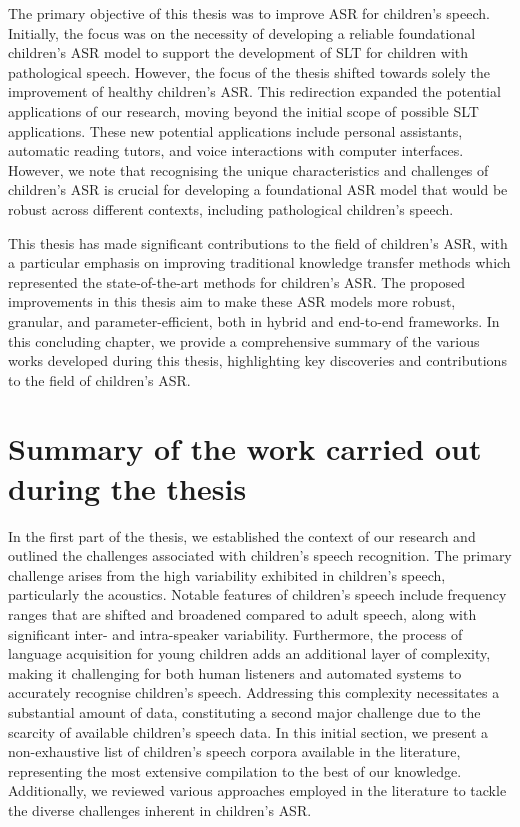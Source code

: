 \label{chap:8}
\cleardoublepage

The primary objective of this thesis was to improve \ac{ASR} for children's speech. Initially, the focus was on the necessity of developing a reliable foundational children's \ac{ASR} model to support the development of \ac{SLT} for children with pathological speech. However, the focus of the thesis shifted towards solely the improvement of healthy children's \ac{ASR}. This redirection expanded the potential applications of our research, moving beyond the initial scope of possible \ac{SLT} applications. These new potential applications include personal assistants, automatic reading tutors, and voice interactions with computer interfaces. However, we note that recognising the unique characteristics and challenges of children's \ac{ASR} is crucial for developing a foundational \ac{ASR} model that would be robust across different contexts, including pathological children's speech.

This thesis has made significant contributions to the field of children's \ac{ASR}, with a particular emphasis on improving traditional knowledge transfer methods which represented the state-of-the-art methods for children's \ac{ASR}. The proposed improvements in this thesis aim to make these \ac{ASR} models more robust, granular, and parameter-efficient, both in hybrid and end-to-end frameworks. In this concluding chapter, we provide a comprehensive summary of the various works developed during this thesis, highlighting key discoveries and contributions to the field of children's \ac{ASR}.

\section{Summary of the work carried out during the thesis}
In the first part of the thesis, we established the context of our research and outlined the challenges associated with children's speech recognition. The primary challenge arises from the high variability exhibited in children's speech, particularly the acoustics. Notable features of children's speech include frequency ranges that are shifted and broadened compared to adult speech, along with significant inter- and intra-speaker variability. Furthermore, the process of language acquisition for young children adds an additional layer of complexity, making it challenging for both human listeners and automated systems to accurately recognise children's speech. Addressing this complexity necessitates a substantial amount of data, constituting a second major challenge due to the scarcity of available children's speech data. In this initial section, we present a non-exhaustive list of children's speech corpora available in the literature, representing the most extensive compilation to the best of our knowledge. Additionally, we reviewed various approaches employed in the literature to tackle the diverse challenges inherent in children's \ac{ASR}.

